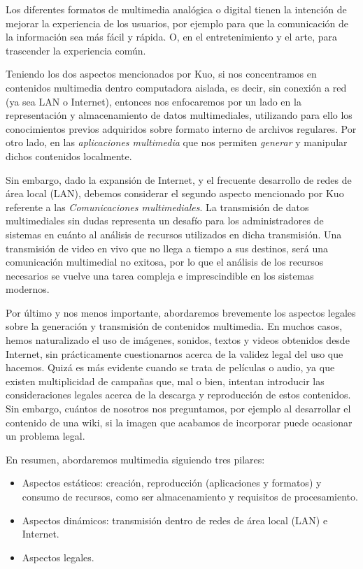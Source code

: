 \documentclass[12pt]{article}
\begin{document}
Los diferentes formatos de multimedia analógica o digital tienen la 
intención de mejorar la experiencia de los usuarios, por ejemplo para 
que la comunicación de la información sea más fácil y rápida. O, en 
el entretenimiento y el arte, para trascender la experiencia común.\cite{wikipmmes} 

Teniendo los dos aspectos mencionados por Kuo, si nos concentramos en contenidos 
multimedia dentro computadora aislada, es decir,  sin conexión a red (ya sea LAN o 
Internet), entonces nos enfocaremos por un lado en la representación y almacenamiento 
de datos multimediales, utilizando para ello los conocimientos previos 
adquiridos sobre formato interno de archivos regulares. Por otro lado, en 
las {\it aplicaciones multimedia} que nos permiten {\it generar} y manipular 
dichos contenidos localmente. 

Sin embargo, dado la expansión de Internet, y el frecuente desarrollo 
de redes de área local (LAN), debemos considerar el segundo aspecto mencionado
por Kuo referente a las {\it Comunicaciones multimediales}. La transmisión 
de datos multimediales sin dudas representa un desafío para los administradores
de sistemas en cuánto al análisis de recursos utilizados en dicha transmisión.
Una transmisión de video en vivo que no llega a tiempo a sus destinos, será 
una comunicación multimedial no exitosa, por lo que el análisis de los 
recursos necesarios se vuelve una tarea compleja e imprescindible en los 
sistemas modernos. 

Por último y nos menos importante, abordaremos brevemente los aspectos legales 
sobre la generación y transmisión de contenidos multimedia. En muchos casos,
hemos naturalizado el uso de imágenes, sonidos, textos y videos obtenidos 
desde Internet, sin prácticamente cuestionarnos acerca de la validez 
legal del uso que hacemos. Quizá es más evidente cuando se trata de 
películas o audio, ya que existen multiplicidad de campañas que, mal o 
bien, intentan introducir las consideraciones legales acerca de la descarga y 
reproducción de estos contenidos. Sin embargo, cuántos de nosotros nos 
preguntamos, por ejemplo al desarrollar el contenido de una wiki, si la 
imagen que acabamos de incorporar puede ocasionar un problema legal. 

En resumen, abordaremos multimedia siguiendo tres pilares:
\begin{itemize}
\item Aspectos estáticos: creación, reproducción (aplicaciones y formatos) y 
consumo de recursos, como ser almacenamiento y requisitos de procesamiento. 
\item Aspectos dinámicos: transmisión dentro de redes de área local (LAN) e 
Internet. 
\item Aspectos legales.  
\end{itemize}
\end{document}

